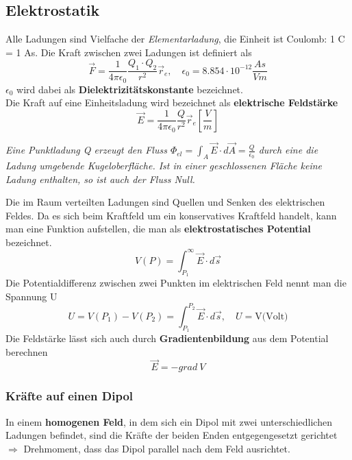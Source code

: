 \documentclass[12pt,a4paper,ngerman]{article}
\begin{document}
\subsection{Elektrostatik}
Alle Ladungen sind Vielfache der \textit{Elementarladung}, die Einheit ist Coulomb: 1 C = 1 As. Die Kraft zwischen zwei Ladungen ist definiert als
\begin{equation}
\vec{F} = \frac{1}{4 \pi \epsilon_0}\frac{Q_1 \cdot Q_2}{r^2} \vec{r}_e, \quad \epsilon_0 = 8.854\cdot 10^{-12}\frac{As}{Vm}
\end{equation}
$\epsilon_0$ wird dabei als \textbf{Dielektrizitätskonstante} bezeichnet. \\
Die Kraft auf eine Einheitsladung wird bezeichnet als \textbf{elektrische Feldstärke}
\begin{equation}
\vec{E} = \frac{1}{4 \pi \epsilon_0} \frac{Q}{r^2}\vec{r}_e \left[\frac{V}{m}\right]
\end{equation}
\begin{center}
\textit{
Eine Punktladung Q erzeugt den Fluss $\Phi_{el} = \int_A{\vec{E}\cdot d\vec{A}} =  \frac{Q}{\epsilon_0}$ durch eine die Ladung umgebende Kugeloberfläche. Ist in einer geschlossenen Fläche keine Ladung enthalten, so ist auch der Fluss Null. } 
\end{center}
Die im Raum verteilten Ladungen sind Quellen und Senken des elektrischen Feldes. Da es sich beim Kraftfeld um ein konservatives Kraftfeld handelt, kann man eine Funktion aufstellen, die man als \textbf{elektrostatisches Potential} bezeichnet. 
\begin{equation}
V(P) = \int_{P_1}^{\infty}{\vec{E}\cdot d\vec{s}}
\end{equation}
Die Potentialdifferenz zwischen zwei Punkten im elektrischen Feld nennt man die Spannung U
\begin{equation}
U = V(P_1) - V(P_2) = \int_{P_1}^{P_2}{\vec{E}\cdot d\vec{s}}, \quad U = \text{V(Volt)}
\end{equation}
Die Feldstärke lässt sich auch durch \textbf{Gradientenbildung} aus dem Potential berechnen
\begin{equation}
\vec{E} = -grad \ V
\end{equation}

\subsubsection*{Kräfte auf einen Dipol}
In einem \textbf{homogenen Feld}, in dem sich ein Dipol mit zwei unterschiedlichen Ladungen befindet, sind die Kräfte der beiden Enden entgegengesetzt gerichtet $\Rightarrow$ Drehmoment, dass das Dipol parallel nach dem Feld ausrichtet. 
\end{document}
